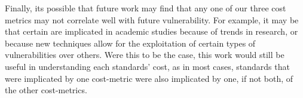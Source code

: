 Finally, its possible that future work may find that any one of our three cost
metrics may not correlate well with future vulnerability.  For example, it may
be that certain \WASs are implicated in academic studies because of trends in
research, or because new techniques allow for the exploitation of certain types
of vulnerabilities over others.  Were this to be the case, this work would
still be useful in understanding each standards' cost, as in most
cases, standards that were implicated by one cost-metric were also implicated
by one, if not both, of the other cost-metrics.
